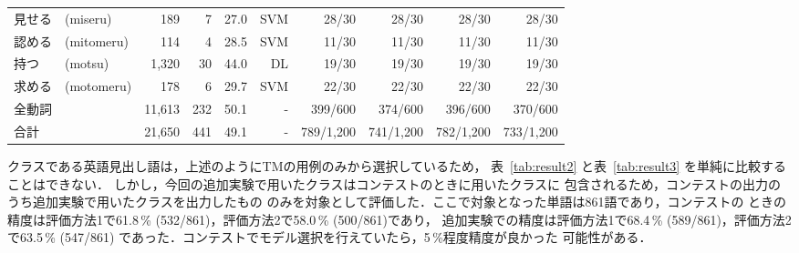 \begin{table*}[htbp]
\begin{center}
\begin{tabular}[c]{|l@{}l|r|r|r|r|@{ }r@{ }r|@{ }r@{ }r|}
      見せる & (miseru) & 189 & 7 & 27.0 & SVM 
      & 28/30 & 28/30 & 28/30 & 28/30 \\
      認める & (mitomeru) & 114 & 4 & 28.5 & SVM
      & 11/30 & 11/30 & 11/30 & 11/30 \\
      持つ & (motsu) & 1,320 & 30 & 44.0 & DL
      & 19/30 & 19/30 & 19/30 & 19/30 \\
      求める & (motomeru) & 178 & 6 & 29.7 & SVM 
      & 22/30 & 22/30 & 22/30 & 22/30 \\
      \hline
      全動詞 & & 11,613 & 232 & 50.1 & - 
      & 399/600 & 374/600 & 396/600 & 370/600 \\
      \hline
      合計 & & 21,650 & 441 & 49.1 & - 
      & 789/1,200 & 741/1,200 & 782/1,200 & 733/1,200 \\
      \hline
    \end{tabular}
  \end{center}
\end{table*}

クラスである英語見出し語は，上述のようにTMの用例のみから選択しているため，
表~\ref{tab:result2} と表~\ref{tab:result3} を単純に比較することはできない．
しかし，今回の追加実験で用いたクラスはコンテストのときに用いたクラスに
包含されるため，コンテストの出力のうち追加実験で用いたクラスを出力したもの
のみを対象として評価した．ここで対象となった単語は861語であり，コンテストの
ときの精度は評価方法1で61.8\,\% (532/861)，評価方法2で58.0\,\% (500/861)であり，
追加実験での精度は評価方法1で68.4\,\% (589/861)，評価方法2で63.5\,\% (547/861)
であった．コンテストでモデル選択を行えていたら，5\,\%程度精度が良かった
可能性がある．

